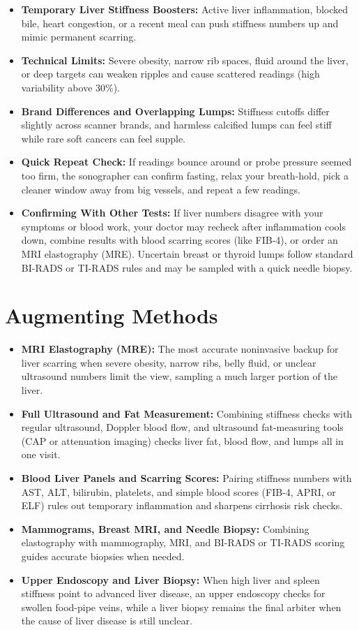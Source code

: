 \begin{itemize}
    \item \textbf{Temporary Liver Stiffness Boosters:} Active liver inflammation, blocked bile, heart congestion, or a recent meal can push stiffness numbers up and mimic permanent scarring.
    \item \textbf{Technical Limits:} Severe obesity, narrow rib spaces, fluid around the liver, or deep targets can weaken ripples and cause scattered readings (high variability above 30\%).
    \item \textbf{Brand Differences and Overlapping Lumps:} Stiffness cutoffs differ slightly across scanner brands, and harmless calcified lumps can feel stiff while rare soft cancers can feel supple.
    \item \textbf{Quick Repeat Check:} If readings bounce around or probe pressure seemed too firm, the sonographer can confirm fasting, relax your breath-hold, pick a cleaner window away from big vessels, and repeat a few readings.
    \item \textbf{Confirming With Other Tests:} If liver numbers disagree with your symptoms or blood work, your doctor may recheck after inflammation cools down, combine results with blood scarring scores (like FIB-4), or order an MRI elastography (MRE). Uncertain breast or thyroid lumps follow standard BI-RADS or TI-RADS rules and may be sampled with a quick needle biopsy.
\end{itemize}

\section{Augmenting Methods}

\begin{itemize}
    \item \textbf{MRI Elastography (MRE):} The most accurate noninvasive backup for liver scarring when severe obesity, narrow ribs, belly fluid, or unclear ultrasound numbers limit the view, sampling a much larger portion of the liver.
    \item \textbf{Full Ultrasound and Fat Measurement:} Combining stiffness checks with regular ultrasound, Doppler blood flow, and ultrasound fat-measuring tools (CAP or attenuation imaging) checks liver fat, blood flow, and lumps all in one visit.
    \item \textbf{Blood Liver Panels and Scarring Scores:} Pairing stiffness numbers with AST, ALT, bilirubin, platelets, and simple blood scores (FIB-4, APRI, or ELF) rules out temporary inflammation and sharpens cirrhosis risk checks.
    \item \textbf{Mammograms, Breast MRI, and Needle Biopsy:} Combining elastography with mammography, MRI, and BI-RADS or TI-RADS scoring guides accurate biopsies when needed.
    \item \textbf{Upper Endoscopy and Liver Biopsy:} When high liver and spleen stiffness point to advanced liver disease, an upper endoscopy checks for swollen food-pipe veins, while a liver biopsy remains the final arbiter when the cause of liver disease is still unclear.
\end{itemize}

